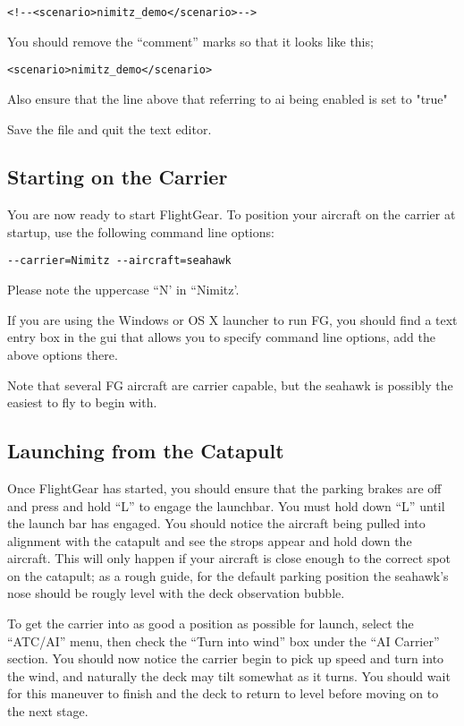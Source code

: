 \begin{enumerate}
\begin{verbatim}
<!--<scenario>nimitz_demo</scenario>-->
\end{verbatim}

You should remove the ``comment'' marks so that it looks like this;


\begin{verbatim}
<scenario>nimitz_demo</scenario>
\end{verbatim}

Also ensure that the line above that referring to ai being enabled is set to "true"

Save the file and quit the text editor.

\subsection{Starting on the Carrier}

You are now ready to start FlightGear. To position your aircraft on the carrier at startup,
use the following command line options:

\begin{verbatim}
--carrier=Nimitz --aircraft=seahawk
\end{verbatim}

Please note the uppercase ``N' in ``Nimitz'.

If you are using the Windows or OS X launcher to run FG, you should find a text entry box in the gui that
allows you to specify command line options, add the above options there.

Note that several FG aircraft are carrier capable, but the seahawk is possibly the easiest to fly to begin with.

\subsection{Launching from the Catapult}

Once FlightGear has started, you should ensure that the parking brakes are off and press and hold ``L'' to
engage the launchbar. You must hold down ``L'' until the launch bar has engaged.
You should notice the aircraft being pulled into alignment with the catapult and see
the strops appear and hold down the aircraft.  This will only happen if your aircraft is
close enough to the correct spot on the catapult; as a rough guide, for the default
parking position the seahawk's nose should be rougly level with the deck observation bubble.

To get the carrier into as good a position as possible for launch, select the ``ATC/AI'' menu, then
check the ``Turn into wind'' box under the ``AI Carrier'' section. You should now notice the carrier
begin to pick up speed and turn into the wind, and naturally the deck may tilt somewhat as it turns.
You should wait for this maneuver to finish and the deck to return to level before moving on to the next stage.


\end{enumerate}
